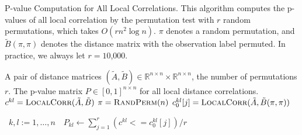 \documentclass[11pt]{article}
\newcommand{\note}[2][]{\added[#1,remark={#2}]{}}
\newcommand{\Real}{\mathbb{R}}
\newcommand{\G}{c}
\newcommand{\Linefor}[2]{%
    \State \algorithmicfor\ {#1}\ \algorithmicdo\ {#2} \algorithmicend\ \algorithmicfor%
}
\newcommand{\cs}[1]{{\note{cs: #1}}}
\newcommand{\rto}{\leftarrow}
\begin{document}
\begin{algorithm}
\caption{P-value Computation for All Local Correlations. This algorithm computes the p-values of all local correlation by the permutation test with $r$ random permutations, which takes $O(rn^2 \log n)$. $\pi$ denotes a random permutation, and $\tilde{B}(\pi,\pi)$ denotes the distance matrix with the observation label permuted. In practice, we always let $r=10$,$000$. \cs{is this true?}}
\label{alg:pval}
\begin{algorithmic}[1]
\Require A pair of distance matrices $(\tilde{A},\tilde{B}) \in \Real^{n \times n} \times \Real^{n \times n}$, the number of permutations $r$.
\Ensure The p-value matrix $P \in [0,1]^{n \times n}$ for all local distance correlations.
\State $\G^{kl}=\textsc{LocalCorr}(\tilde{A},\tilde{B})$ 
\State $\pi=\textsc{RandPerm}(n)$  
\State $\G^{kl}_{0}[j]=\textsc{LocalCorr}(\tilde{A},\tilde{B}(\pi,\pi))$ 
\EndFor

\Linefor{$k,l:=1,\ldots,n$}{$P_{kl} \rto \sum_{j=1}^{r}(\G^{kl}<=\G^{kl}_{0}[j])/r$}
\EndFunction
\end{algorithmic}
\end{algorithm}
\end{document}
